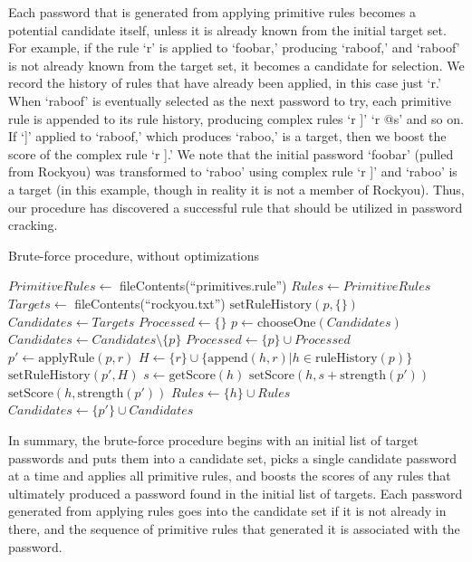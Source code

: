 \documentclass[letterpaper,twocolumn,10pt]{article}
\begin{document}
Each password that is generated from applying primitive rules becomes a
potential candidate itself, unless it is already known from the initial target
set. For example, if the rule `r' is applied to `foobar,' producing `raboof,'
and `raboof' is not already known from the target set, it becomes a candidate
for selection. We record the history of rules that have already been applied, in
this case just `r.' When `raboof' is eventually selected as the next password to
try, each primitive rule is appended to its rule history, producing complex
rules `r ]' `r @s' and so on. If `]' applied to `raboof,' which produces
`raboo,' is a target, then we boost the score of the complex rule `r ].' We note
that the initial password `foobar' (pulled from Rockyou) was transformed to
`raboo' using complex rule `r ]' and `raboo' is a target (in this example,
though in reality it is not a member of Rockyou). Thus, our procedure has
discovered a successful rule that should be utilized in password cracking.

\begin{algorithm}\caption{Brute-force procedure, without optimizations}
\begin{algorithmic}[1]
\State $PrimitiveRules \gets $ fileContents(``primitives.rule'')
\State $Rules \gets PrimitiveRules$
\State $Targets \gets $ fileContents(``rockyou.txt'')
  \State $\mathrm{setRuleHistory}(p, \{\})$
\EndFor
\State $Candidates \gets Targets$
\State $Processed \gets \{\}$
  \State $p \gets \mathrm{chooseOne}(Candidates)$
  \State $Candidates \gets Candidates \setminus \{p\}$
  \State $Processed \gets \{p\} \cup Processed$
    \State $p' \gets \mathrm{applyRule}(p, r)$
    \State $H \gets \{r\}\cup\{\mathrm{append}(h, r)|h \in
\mathrm{ruleHistory}(p)\}$
    \State $\mathrm{setRuleHistory}(p', H)$
          \State $s \gets \mathrm{getScore}(h)$
          \State $\mathrm{setScore}(h,
s+\mathrm{strength}(p'))$
        \Else
          \State $\mathrm{setScore}(h, \mathrm{strength}(p'))$
          \State $Rules \gets \{h\}\cup Rules$
        \EndIf
      \EndFor
    \EndIf
      \State $Candidates \gets \{p'\}\cup Candidates$
    \EndIf
  \EndFor
\EndWhile
\end{algorithmic}
\label{alg:brute-force}
\end{algorithm}

In summary, the brute-force procedure begins with an initial list of target
passwords and puts them into a candidate set, picks a single candidate password
at a time and applies all primitive rules, and boosts the scores of any rules
that ultimately produced a password found in the initial list of targets. Each
password generated from applying rules goes into the candidate set if it is not
already in there, and the sequence of primitive rules that generated it is
associated with the password.
\end{document}
